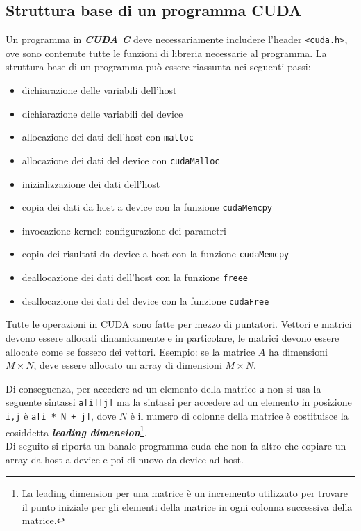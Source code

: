 \subsection{Struttura base di un programma CUDA}
\noindent Un programma in \textit{\textbf{CUDA C}} deve necessariamente includere l'header \texttt{<cuda.h>}, ove sono contenute tutte le funzioni di libreria necessarie al programma. La struttura base di un programma può essere riassunta nei seguenti passi:
\begin{itemize}
    \item dichiarazione delle variabili dell'host
    \item dichiarazione delle variabili del device
    \item allocazione dei dati dell'host con \texttt{malloc}
    \item allocazione dei dati del device con \texttt{cudaMalloc}
    \item inizializzazione dei dati dell'host
    \item copia dei dati da host a device con la funzione \texttt{cudaMemcpy}
    \item invocazione kernel: configurazione dei parametri
    \item copia dei risultati da device a host con la funzione \texttt{cudaMemcpy}
    \item deallocazione dei dati dell'host con la funzione \texttt{freee}
    \item deallocazione dei dati del device con la funzione \texttt{cudaFree}
\end{itemize}
Tutte le operazioni in CUDA sono fatte per mezzo di puntatori. Vettori e matrici devono essere allocati dinamicamente e in particolare, le matrici devono essere allocate come se fossero dei vettori. Esempio: se la matrice $A$ ha dimensioni $M \times N$, deve essere allocato un array di dimensioni $M \times N$.



\noindent Di conseguenza, per accedere ad un elemento della matrice \texttt{a} non si usa la seguente sintassi \texttt{a[i][j]} ma la sintassi per accedere ad un elemento in posizione \texttt{i,j} è \texttt{a[i * N + j]}, dove $N$ è il numero di colonne della matrice è costituisce la cosiddetta \textit{\textbf{leading dimension}}\footnote{La leading dimension per una matrice è un incremento utilizzato per trovare il punto iniziale per gli elementi della matrice in ogni colonna successiva della matrice.\cite{leading-dimension}}. \\
\noindent Di seguito si riporta un banale programma cuda che non fa altro che copiare un array da host a device e poi di nuovo da device ad host.
\vspace{0.5cm}

